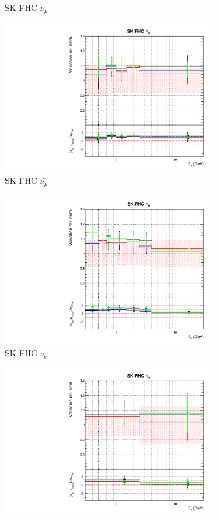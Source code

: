 \begin{figure}[!htbp]
\begin{subfigure}{0.45\textwidth}
  \caption{SK FHC $\nu_{\mu}$}
\end{subfigure}
\begin{subfigure}{0.45\textwidth}
  \centering
  \includegraphics[width=0.75\linewidth]{figs/detcovbinflux_9}
  \caption{SK FHC $\bar{\nu_{\mu}}$}
\end{subfigure}
\begin{subfigure}{0.45\textwidth}
  \centering
  \includegraphics[width=0.75\linewidth]{figs/detcovbinflux_10}
  \caption{SK FHC $\nu_e$}
\end{subfigure}
\begin{subfigure}{0.45\textwidth}
  \centering
  \includegraphics[width=0.75\linewidth]{figs/detcovbinflux_11}

\end{subfigure}
\end{figure}
